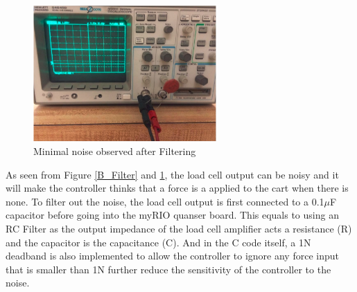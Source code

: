 \begin{figure}[ht]
\begin{center}
\includegraphics[width=2.75in]{Images/After_Filter.PNG}
\caption{Minimal noise observed after Filtering}
\label{A_Filter}
\end{center}
\end{figure}
As seen from Figure \ref{B_Filter} and \ref{A_Filter}, the load cell output can be noisy and it will make the controller thinks that a force is a applied to the cart when there is none. To filter out the noise, the load cell output is first connected to a 0.1$\mu$F capacitor before going into the myRIO quanser board. This equals to using an RC Filter as the output impedance of the load cell amplifier acts a resistance (R) and the capacitor is the capacitance (C). And in the C code itself, a 1N deadband is also implemented to allow the controller to ignore any force input that is smaller than 1N further reduce the sensitivity of the controller to the noise.
